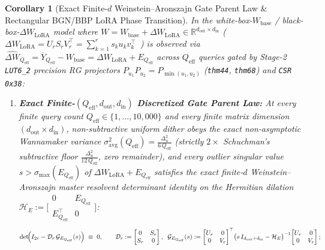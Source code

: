 \documentclass[11pt,letterpaper]{article}
\theoremstyle{spectralthm}
\newtheorem{corollary}[theorem]{Corollary}
\begin{document}
\begin{corollary}[Exact Finite-$d$ Weinstein--Aronszajn Gate Parent Law \& Rectangular BGN/BBP LoRA Phase Transition]
\label{cor:bbp_lora}
\label{cor:bbp_wall}
\label{thm:bbp_spectral_wall}
In the white-box-$W_{\mathrm{base}}$ / black-box-$\Delta W_{\mathrm{LoRA}}$ model where $W = W_{\mathrm{base}} + \Delta W_{\mathrm{LoRA}} \in \mathbb{R}^{d_{\mathrm{out}} \times d_{\mathrm{in}}}$ ($\Delta W_{\mathrm{LoRA}} = U_r S_r V_r^\top = \sum_{k=1}^r s_k u_k v_k^\top$~\cite{hu2022lora}) is observed via $\widehat{\Delta W}_{Q_{\mathrm{eff}}} = \overline{Y}_{Q_{\mathrm{eff}}} - W_{\mathrm{base}} = \Delta W_{\mathrm{LoRA}} + E_{Q_{\mathrm{eff}}}$ across $Q_{\mathrm{eff}}$ queries gated by Stage-2 \texttt{LUT6\_2} precision RG projectors $P_{u_1}P_{u_2} = P_{\min(u_1,u_2)}$ (\texttt{thm44}, \texttt{thm68}) and \texttt{CSR 0x38}:
\begin{enumerate}
  \item[(i)] \textbf{Exact Finite-$(Q_{\mathrm{eff}}, d_{\mathrm{out}}, d_{\mathrm{in}})$ Discretized Gate Parent Law:} At every finite query count $Q_{\mathrm{eff}} \in \{1,\dots,10{,}000\}$ and every finite matrix dimension $(d_{\mathrm{out}} \times d_{\mathrm{in}})$, non-subtractive uniform dither obeys the exact non-asymptotic Wannamaker variance $\sigma_{\mathrm{avg}}^2(Q_{\mathrm{eff}}) = \frac{\Delta_u^2}{6\,Q_{\mathrm{eff}}}$ (strictly $2\times$ Schuchman's subtractive floor $\frac{\Delta_u^2}{12\,Q_{\mathrm{eff}}}$, zero remainder), and every outlier singular value $s > \sigma_{\max}(E_{Q_{\mathrm{eff}}})$ of $\Delta W_{\mathrm{LoRA}} + E_{Q_{\mathrm{eff}}}$ satisfies the exact finite-$d$ Weinstein--Aronszajn master resolvent determinant identity on the Hermitian dilation $\mathcal{H}_E := \bigl[\begin{smallmatrix} 0 & E_{Q_{\mathrm{eff}}} \\ E_{Q_{\mathrm{eff}}}^\top & 0 \end{smallmatrix}\bigr]$:
  \begin{equation}
  \label{eq:weinstein_aronszajn_parent}
  \det\!\Bigl(I_{2r} - \mathcal{D}_r\,\mathcal{G}_{E_{Q_{\mathrm{eff}}}}(s)\Bigr) \;\equiv\; 0, \qquad
  \mathcal{D}_r := \begin{bmatrix} 0 & S_r \\ S_r & 0 \end{bmatrix},\;\;
  \mathcal{G}_{E_{Q_{\mathrm{eff}}}}(s) := \begin{bmatrix} U_r & 0 \\ 0 & V_r \end{bmatrix}^\top \!\bigl(s\,I_{d_{\mathrm{out}}+d_{\mathrm{in}}} - \mathcal{H}_E\bigr)^{-1}\! \begin{bmatrix} U_r & 0 \\ 0 & V_r \end{bmatrix};

\end{equation}
\end{enumerate}
\end{corollary}
\end{document}

